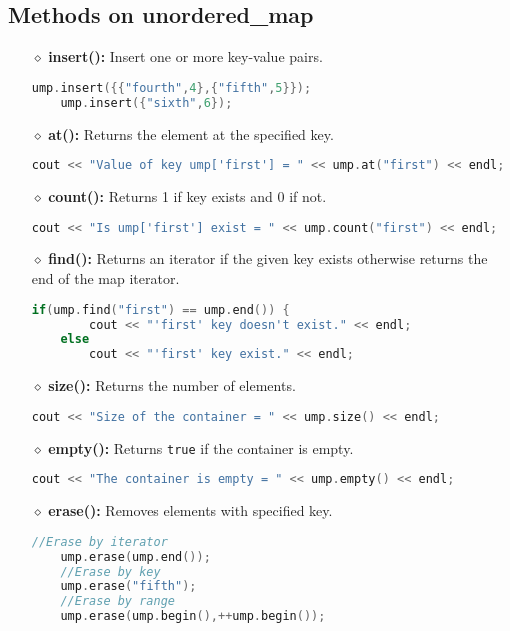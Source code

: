 \subsection{Methods on unordered\_map}
\begin{itemize}
	\item[{\LARGE $\diamond$}] \textbf{insert():} Insert one or more key-value pairs.
	\begin{lstlisting}[language=C++]
	ump.insert({{"fourth",4},{"fifth",5}});
	ump.insert({"sixth",6});
	\end{lstlisting}
	
	\item[{\LARGE $\diamond$}] \textbf{at():} Returns the element at the specified key.
	\begin{lstlisting}[language=C++]
	cout << "Value of key ump['first'] = " << ump.at("first") << endl;
	\end{lstlisting}
	
	\item[{\LARGE $\diamond$}] \textbf{count():} Returns 1 if key exists and 0 if not.
	\begin{lstlisting}[language=C++]
	cout << "Is ump['first'] exist = " << ump.count("first") << endl;
	\end{lstlisting}
	
	\item[{\LARGE $\diamond$}] \textbf{find():} Returns an iterator if the given key exists otherwise returns the end of the map iterator.
	\begin{lstlisting}[language=C++]
	if(ump.find("first") == ump.end()) {
		cout << "'first' key doesn't exist." << endl;
	else
		cout << "'first' key exist." << endl;
	\end{lstlisting}
	
	\item[{\LARGE $\diamond$}] \textbf{size():} Returns the number of elements.
	\begin{lstlisting}[language=C++]
	cout << "Size of the container = " << ump.size() << endl;
	\end{lstlisting}
	
	\item[{\LARGE $\diamond$}] \textbf{empty():} Returns \texttt{true} if the container is empty.
	\begin{lstlisting}[language=C++]
	cout << "The container is empty = " << ump.empty() << endl;
	\end{lstlisting}
	
	\item[{\LARGE $\diamond$}] \textbf{erase():} Removes elements with specified key.
	\begin{lstlisting}[language=C++]
	//Erase by iterator
	ump.erase(ump.end());
	//Erase by key
	ump.erase("fifth");
	//Erase by range
	ump.erase(ump.begin(),++ump.begin());
	\end{lstlisting}
	

\end{itemize}
